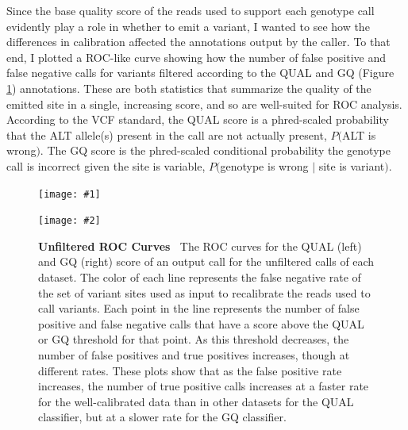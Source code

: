 \documentclass{report}
\newcommand{\titlecaption}[2]{\caption[#1]{\textbf{#1 \textbar\,} #2}}
\newcommand{\includetwo}[2]{\begin{minipage}{.475\textwidth}%
\texttt{[image: \#1]}%
\end{minipage}\hfill\begin{minipage}{.475\textwidth}%
\texttt{[image: \#2]}%
\end{minipage}}
\begin{document}
\begin{outline}
\item Since the base quality score of the reads used to support each genotype call evidently play a role in whether to emit a variant, I wanted to see how the differences in calibration affected the annotations output by the caller. To that end, I plotted a ROC-like curve showing how the number of false positive and false negative calls for variants filtered according to the QUAL and GQ (Figure \ref{fig:vc_rocs}) annotations. These are both statistics that summarize the quality of the emitted site in a single, increasing score, and so are well-suited for ROC analysis. According to the VCF standard, the QUAL score is a phred-scaled probability that the ALT allele(s) present in the call are not actually present, $P($ALT is wrong$)$. The GQ score is the phred-scaled conditional probability the genotype call is incorrect given the site is variable, $P($genotype is wrong $|$ site is variant$)$.
\end{outline}


\begin{figure}
\centering
\includetwo{qualroc.pdf}{gqroc.pdf}
\titlecaption{Unfiltered ROC Curves}{The ROC curves for the QUAL (left) and GQ (right) score of an output call for the unfiltered calls of each dataset. The color of each line represents the false negative rate of the set of variant sites used as input to recalibrate the reads used to call variants. Each point in the line represents the number of false positive and false negative calls that have a score above the QUAL or GQ threshold for that point. As this threshold decreases, the number of false positives and true positives increases, though at different rates. These plots show that as the false positive rate increases, the number of true positive calls increases at a faster rate for the well-calibrated data than in other datasets for the QUAL classifier, but at a slower rate for the GQ classifier.}
\label{fig:vc_rocs}
\end{figure}
\end{document}
